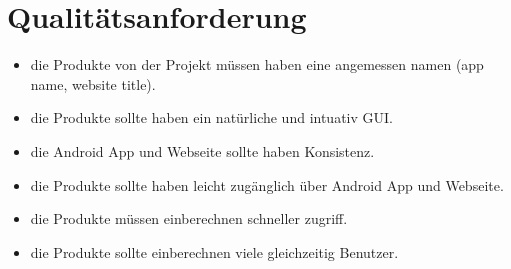 \section*{Qualit{\"a}tsanforderung}
\begin{itemize}
\item
die Produkte von der Projekt müssen haben eine angemessen namen (app name, website title).
\item
die Produkte sollte haben ein natürliche und intuativ GUI.
\item
die Android App und Webseite sollte haben Konsistenz.
\item
die Produkte sollte haben leicht zugänglich über Android App und Webseite.
\item
die Produkte müssen einberechnen schneller zugriff.
\item
die Produkte sollte einberechnen viele gleichzeitig Benutzer.
\end{itemize}
